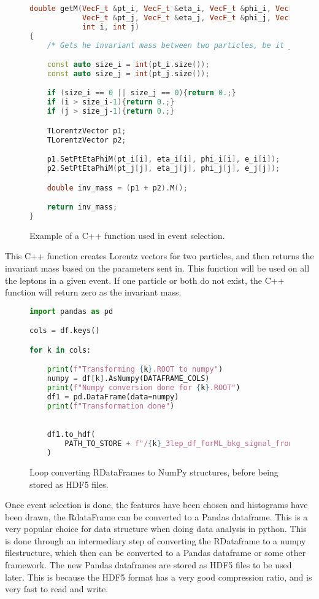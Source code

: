 \begin{figure}[H]
    \centering
\begin{lstlisting}[language=C++, style=cppstyle, label={code:cpp_func_example}]
double getM(VecF_t &pt_i, VecF_t &eta_i, VecF_t &phi_i, VecF_t &e_i,
            VecF_t &pt_j, VecF_t &eta_j, VecF_t &phi_j, VecF_t &e_j,
            int i, int j)
{
    /* Gets he invariant mass between two particles, be it jets or leptons */

    const auto size_i = int(pt_i.size());
    const auto size_j = int(pt_j.size());

    if (size_i == 0 || size_j == 0){return 0.;}
    if (i > size_i-1){return 0.;}
    if (j > size_j-1){return 0.;}

    TLorentzVector p1;
    TLorentzVector p2;

    p1.SetPtEtaPhiM(pt_i[i], eta_i[i], phi_i[i], e_i[i]);
    p2.SetPtEtaPhiM(pt_j[j], eta_j[j], phi_j[j], e_j[j]);

    double inv_mass = (p1 + p2).M();

    return inv_mass;
}
\end{lstlisting}
\caption[C++ function example]{Example of a C++ function used in event selection.}
\end{figure}
This C++ function creates Lorentz vectors for two particles, and then returns the invariant mass based on the parameters sent in. 
This function will be used on all the leptons in a given event. If one particle or both do not exist, the C++ function will
return zero as the invariant mass. \par


\begin{figure}[H]
    \centering
\begin{lstlisting}[language=Python, style=pythonstyle, label={code:python_func_example_2}]
import pandas as pd 

cols = df.keys()

for k in cols:

    print(f"Transforming {k}.ROOT to numpy")
    numpy = df[k].AsNumpy(DATAFRAME_COLS)
    print(f"Numpy conversion done for {k}.ROOT")
    df1 = pd.DataFrame(data=numpy)
    print(f"Transformation done")
    

    df1.to_hdf(
        PATH_TO_STORE + f"/{k}_3lep_df_forML_bkg_signal_fromRDF.hdf5", "mini"
    )

\end{lstlisting}
\caption[Conversion from RDataFrame to NumPy]{Loop converting RDataFrames to NumPy structures, before being stored as HDF5 files.}
\end{figure}

Once event selection is done, the features have been chosen and histograms have been 
drawn, the RdataFrame can be converted to a Pandas dataframe. This is a very popular 
choice for data structure when doing data analysis in python. This is done through an 
intermediary step of converting the RDataframe to a numpy filestructure, which then can 
be converted to a Pandas\cite{reback2020pandas} dataframe or some other framework.
The new Pandas dataframes are stored as HDF5\cite{hdf5} files to be used later. This is 
because the HDF5 format has a very good compression ratio, and is very fast to read and write. 